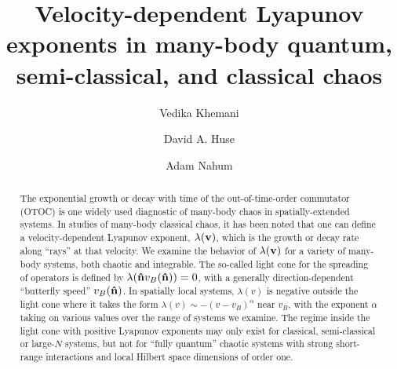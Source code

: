\documentclass[aps,prl,reprint,superscriptaddress, longbibliography]{revtex4-1}
\newcommand{\vb}{v_B}
\newcommand{\lamv}{\lambda(v)}
\begin{document}
\title{Velocity-dependent Lyapunov exponents in many-body quantum,\\  semi-classical, and classical chaos
} 

\author{Vedika Khemani}
\author{David A. Huse}
\author{Adam Nahum}

\begin{abstract}
The exponential growth or decay with time of the out-of-time-order commutator (OTOC) is one widely used diagnostic of many-body chaos in spatially-extended systems.  In studies of many-body classical chaos, it has been noted that one can define a velocity-dependent Lyapunov exponent, $\lambda({\bf v})$, which is the growth or decay rate along ``rays'' at that velocity.  We examine the behavior of $\lambda({\bf v})$ 
for a variety of many-body systems, both chaotic and integrable.  The so-called light cone for the spreading of operators is defined by $\lambda({\bf \hat n}v_B({\bf \hat n}))=0$, with a generally direction-dependent ``butterfly speed'' $v_B({\bf \hat n})$.  In spatially local systems, $\lamv$ is negative outside the light cone where it takes the form $\lambda(v) \sim -(v-v_B)^{\alpha}$ near $\vb$, with the exponent $\alpha$ taking on various values over the range of systems we examine. The regime inside the light cone with positive Lyapunov exponents may only exist for classical, semi-classical or large-$N$ systems, but not for ``fully quantum'' chaotic systems with strong short-range interactions and local Hilbert space dimensions of order one.
\end{abstract}

\maketitle
\end{document}
